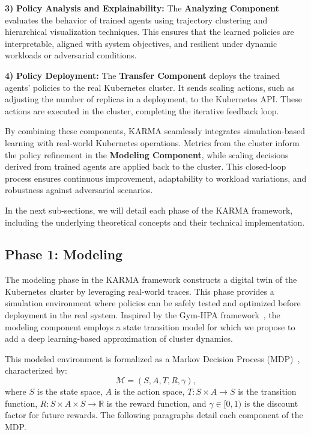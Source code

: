 \documentclass[conference]{IEEEtran}
\begin{document}
\textbf{3)} \textbf{Policy Analysis and Explainability:} The \textbf{Analyzing Component} evaluates the behavior of trained agents using trajectory clustering and hierarchical visualization techniques. This ensures that the learned policies are interpretable, aligned with system objectives, and resilient under dynamic workloads or adversarial conditions.
    
\textbf{4)} \textbf{Policy Deployment:} The \textbf{Transfer Component} deploys the trained agents' policies to the real Kubernetes cluster. It sends scaling actions, such as adjusting the number of replicas in a deployment, to the Kubernetes API. These actions are executed in the cluster, completing the iterative feedback loop.

By combining these components, KARMA seamlessly integrates simulation-based learning with real-world Kubernetes operations. Metrics from the cluster inform the policy refinement in the \textbf{Modeling Component}, while scaling decisions derived from trained agents are applied back to the cluster. This closed-loop process ensures continuous improvement, adaptability to workload variations, and robustness against adversarial scenarios.

In the next sub-sections, we will detail each phase of the KARMA framework, including the underlying theoretical concepts and their technical implementation.

\subsection{Phase 1: Modeling}

The modeling phase in the KARMA framework constructs a digital twin of the Kubernetes cluster by leveraging real-world traces. This phase provides a simulation environment where policies can be safely tested and optimized before deployment in the real system. Inspired by the Gym-HPA framework~\cite{GymHPA}, the modeling component employs a state transition model for which we propose to add a deep learning-based approximation of cluster dynamics.

This modeled environment is formalized as a Markov Decision Process (MDP)~\cite{Puterman2014}, characterized by:
$$
\mathcal{M} = (S, A, T, R, \gamma),
$$
where \( S \) is the state space, \( A \) is the action space, \( T: S \times A \to S \) is the transition function, \( R: S \times A \times S \to \mathbb{R} \) is the reward function, and \( \gamma \in [0, 1) \) is the discount factor for future rewards. The following paragraphs detail each component of the MDP.
\end{document}
